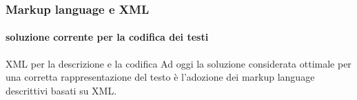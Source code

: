 \begin{frame}
	\frametitle{Markup language e XML}
	\framesubtitle{soluzione corrente per la codifica dei testi}
	\addtocounter{nframe}{1}

	\begin{block}{XML per la descrizione e la codifica}
		Ad oggi la soluzione considerata ottimale per una corretta rappresentazione del testo è l'adozione dei markup language descrittivi basati su XML.
	\end{block}


\end{frame}